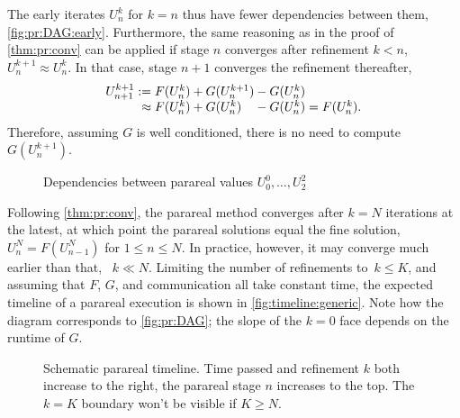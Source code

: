 The early iterates $U_n^k$ for $k=n$ thus have fewer dependencies between them,
\cf \autoref{fig:pr:DAG:early}.
Furthermore, the same reasoning as in the proof of \autoref{thm:pr:conv} can
be applied if stage $n$ converges after refinement $k < n$,
\ie $U^{k+1}_n \approx U^k_n$.
In that case, stage $n+1$ converges the refinement thereafter,
\begin{equation}
  \begin{array}{r@{}l@{}l@{}l}
    U^{k+1}_{n+1}
    :={}      & F(U^k_n) &{}+ G(U^{k+1}_n) &{}- G(U^k_n) \\
    \approx{} & F(U^k_n) &{}+ G(U^k_n)     &{}- G(U^k_n)
    = F(U^k_n)
    .
  \end{array}
\end{equation}
Therefore,
assuming $G$ is well conditioned,
there is no need to compute $G(U^{k+1}_n)$.

\begin{figure}[t]
  \centering
  
  \caption{Dependencies between parareal values $U^0_0, \ldots, U_2^2$}
  \label{fig:pr:DAG:early}
\end{figure}

Following \autoref{thm:pr:conv},
the parareal method converges after $k=N$ iterations at the latest,
at which point the parareal solutions equal the fine solution,
$U_n^N = F(U_{n-1}^N)$ for $1\leq n \leq N$.
In practice, however, it may converge much earlier than that,
\ie~$k\ll N$.
Limiting the number of refinements to~$k\leq K$,
and assuming that $F$, $G$, and communication all take constant time,
the expected timeline of a parareal execution is shown in \autoref{fig:timeline:generic}.
Note how the diagram corresponds to \autoref{fig:pr:DAG};
the slope of the $k=0$ face depends on the runtime of $G$.

\begin{figure}[b]
  \centering
  
  \caption[Schematic parareal timeline]{%
    Schematic parareal timeline.
    Time passed and refinement $k$ both increase to the right,
    the parareal stage $n$ increases to the top.
    The $k=K$ boundary won't be visible if $K\geq N$.
  }
  \label{fig:timeline:generic}
\end{figure}

